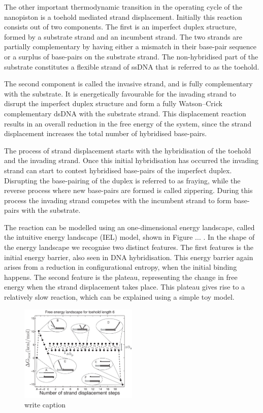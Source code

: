 The other important thermodynamic transition in the operating cycle of the nanopiston
is a toehold mediated strand displacement. Initially this reaction consists out of two
components. The first is an imperfect duplex structure, formed by a substrate strand and
an incumbent strand. The two strands are partially complementary by having either a
mismatch in their base-pair sequence or a surplus of base-pairs on the substrate strand.
The non-hybridised part of the substrate constitutes a flexible strand of ssDNA
that is referred to as the toehold.

The second component is called the invasive strand, and is fully complementary with the
substrate. It is energetically favourable for the invading
strand to disrupt the imperfect duplex structure and form a fully Watson–Crick
complementary dsDNA with the substrate strand. This displacement reaction results in an
overall reduction in the free energy of the system, since the strand displacement
increases the total number of hybridised base-pairs.

The process of strand displacement starts with the hybridisation of the toehold and the
invading strand. Once this initial hybridisation has occurred the invading strand can
start to contest hybridised base-pairs of the imperfect duplex. Disrupting the
base-pairing of the duplex is referred to as fraying, while the reverse process
where new base-pairs are formed is called zippering. During this process the invading
strand competes with the incumbent strand to form base-pairs with the substrate.

The reaction can be modelled using an one-dimensional energy landscape, called the
intuitive energy landscape (IEL) model\cite{Srinivas2013}, shown in Figure ... . In the
shape of the
energy landscape we recognise two distinct features. The first features is the initial
energy barrier, also seen in DNA hybridisation. This energy barrier again arises from a
reduction in configurational entropy, when the initial binding happens. The second
feature is the plateau, representing the change in free energy when the strand
displacement takes place. This plateau gives rise to a relatively slow reaction, which
can be explained using a simple toy model.\\

\begin{figure}[ht]
\begin{center}
  \includegraphics[width=0.5\textwidth]{Figures/ToeholdDiagram.png}
  \caption{write caption \cite{Srinivas2013}}
\end{center}
\end{figure}

